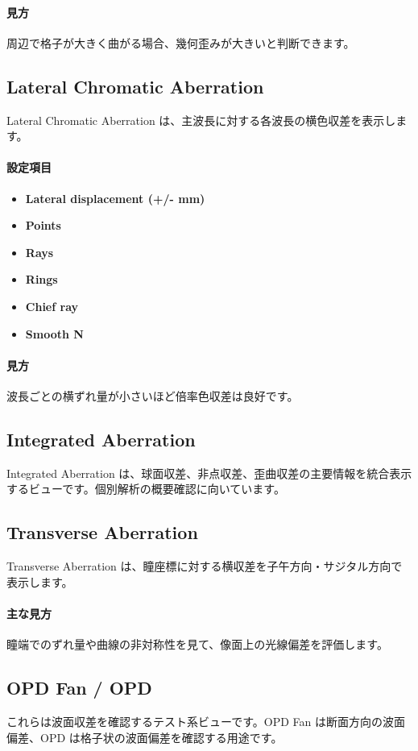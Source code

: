\documentclass[11pt]{article}
\begin{document}
\paragraph{見方}
周辺で格子が大きく曲がる場合、幾何歪みが大きいと判断できます。

\subsection{Lateral Chromatic Aberration}
Lateral Chromatic Aberration は、主波長に対する各波長の横色収差を表示します。

\paragraph{設定項目}
\begin{itemize}
  \item \textbf{Lateral displacement (+/- mm)}
  \item \textbf{Points}
  \item \textbf{Rays}
  \item \textbf{Rings}
  \item \textbf{Chief ray}
  \item \textbf{Smooth N}
\end{itemize}

\paragraph{見方}
波長ごとの横ずれ量が小さいほど倍率色収差は良好です。

\subsection{Integrated Aberration}
Integrated Aberration は、球面収差、非点収差、歪曲収差の主要情報を統合表示するビューです。個別解析の概要確認に向いています。

\subsection{Transverse Aberration}
Transverse Aberration は、瞳座標に対する横収差を子午方向・サジタル方向で表示します。

\paragraph{主な見方}
瞳端でのずれ量や曲線の非対称性を見て、像面上の光線偏差を評価します。

\subsection{OPD Fan / OPD}
これらは波面収差を確認するテスト系ビューです。OPD Fan は断面方向の波面偏差、OPD は格子状の波面偏差を確認する用途です。
\end{document}
